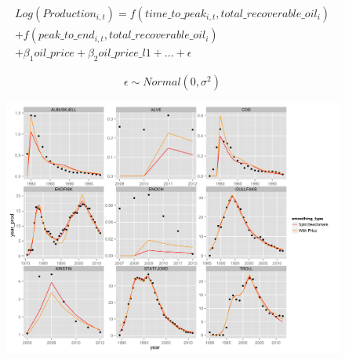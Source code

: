 \documentclass{beamer}
\begin{document}
\begin{frame}[plain]
		\begin{multline}
	\nonumber Log(Production_{i,t})=f(time\_to\_peak_{i,t}, total\_recoverable\_oil_i) \\
	+ f(peak\_to\_end_{i,t}, total\_recoverable\_oil_i) \\
	+ \beta_1 oil\_price + \beta_2 oil\_price\_l1 + ... +  \epsilon
	\end{multline}

		\begin{equation}
		\nonumber \epsilon \sim Normal(0, \sigma^2)
		\end{equation}
\end{frame}

\begin{frame}[plain]
	\begin{figure}
	\includegraphics[width=1\textwidth]{bench_vs_price.png}
	\end{figure}
\end{frame}
\end{document}

